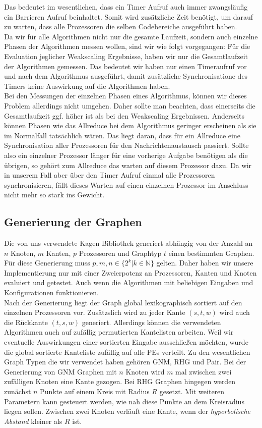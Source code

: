 Das bedeutet im wesentlichen, dass ein Timer Aufruf auch immer zwangsläufig ein Barrieren Aufruf beinhaltet. Somit wird zusätzliche Zeit benötigt, um darauf zu warten, dass alle Prozessoren die selben Codebereiche ausgeführt haben. \\
Da wir für alle Algorithmen nicht nur die gesamte Laufzeit, sondern auch einzelne Phasen der Algorithmen messen wollen, sind wir wie folgt vorgegangen: Für die Evaluation jeglicher Weakscaling Ergebnisse, haben wir nur die Gesamtlaufzeit der Algorithmen gemessen. Das bedeutet wir haben nur einen Timeraufruf vor und nach dem Algorithmus ausgeführt, damit zusätzliche Synchronisatione des Timers keine Auswirkung auf die Algorithmen haben.\\
Bei den Messungen der einzelnen Phasen eines Algorithmus, können wir dieses Problem allerdings nicht umgehen. Daher sollte man beachten, dass einerseits die Gesamtlaufzeit ggf. höher ist als bei den Weakscaling Ergebnissen. Anderseits können Phasen wie das Allreduce bei dem \boruvkaAllreduce Algorithmus geringer erscheinen als sie im Normalfall tatsächlich wären. Das liegt daran, dass für ein Allreduce eine Synchronisation aller Prozessoren für den Nachrichtenaustausch passiert. Sollte also ein einzelner Prozessor länger für eine vorherige Aufgabe benötigen als die übrigen, so gehört zum Allreduce das warten auf diesem Prozessor dazu. Da wir in unserem Fall aber über den Timer Aufruf einmal alle Prozessoren synchronisieren, fällt dieses Warten auf einen einzelnen Prozessor im Anschluss nicht mehr so stark ins Gewicht.


\subsection{Generierung der Graphen}
Die von uns verwendete Kagen Bibliothek generiert abhängig von der Anzahl an $n$ Knoten, $m$ Kanten, $p$ Prozessoren und Graphtyp $t$ einen bestimmten Graphen. Für diese Generierung muss $p,m,n \in \{2^k | k \in \mathbb{N}\}$ gelten. Daher haben wir unsere Implementierung nur mit einer Zweierpotenz an Prozessoren, Kanten und Knoten evaluiert und getestet. Auch wenn die Algorithmen mit beliebigen Eingaben und Konfigurationen funktionieren. \\
Nach der Generierung liegt der Graph global lexikographisch sortiert auf den einzelnen Prozessoren vor. Zusätzslich wird zu jeder Kante $(s,t,w)$ wird auch die Rückkante $(t,s,w)$ generiert. 
Allerdings können die verwendeten Algorithmen auch auf zufällig permutierten Kantelisten arbeiten. Weil wir eventuelle Auswirkungen einer sortierten Eingabe ausschließen möchten, wurde die global sortierte Kanteliste zufällig auf alle PEs verteilt. 
Zu den wesentlichen Graph Typen die wir verwendet haben gehören GNM, RHG und Pair. 
Bei der Generierung von GNM Graphen mit $n$ Knoten wird $m$ mal zwischen zwei zufälligen Knoten eine Kante gezogen.
Bei RHG Graphen hingegen werden zunächst $n$ Punkte auf einem Kreis mit Radius $R$ gesetzt. Mit weiteren Parametern kann gesteuert werden, wie nah diese Punkte an dem Kreisradius liegen sollen. Zwischen zwei Knoten verläuft eine Kante, wenn der \emph{hyperbolische Abstand} kleiner als $R$ ist. \\

